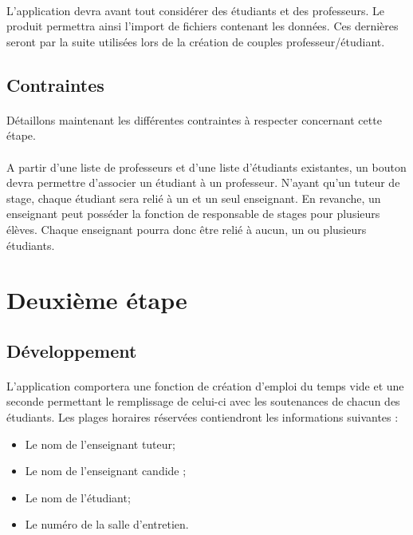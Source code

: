 \documentclass[a4paper,10pt]{report}
\begin{document}
	\paragraph{}
	L'application devra avant tout considérer des étudiants et des professeurs.
	\newline
	Le produit permettra ainsi l'import de fichiers contenant les données. 
	Ces dernières seront par la suite utilisées lors de la création de couples professeur/étudiant. 
  
      \subsection{Contraintes}
	\paragraph{}
	Détaillons maintenant les différentes contraintes à respecter concernant cette étape. 
	\paragraph{}
	A partir d'une liste de professeurs et d'une liste d'étudiants existantes, un bouton devra permettre d'associer un étudiant à un professeur.
	N'ayant qu'un tuteur de stage, chaque étudiant sera relié à un et un seul enseignant.
	En revanche, un enseignant peut posséder la fonction de responsable de stages pour plusieurs élèves. 
	Chaque enseignant pourra donc être relié à aucun, un ou plusieurs étudiants.	
	
      
	
    \section{Deuxième étape}

      \subsection{Développement}
	
	\paragraph{}
	L’application comportera une fonction de création d’emploi du temps vide et une seconde permettant le remplissage de celui-ci avec les soutenances de chacun des étudiants.
	Les plages horaires réservées contiendront les informations suivantes :
	\renewcommand\labelitemi{\textbullet}
	\begin{itemize}
	  \item Le nom de l’enseignant tuteur;
	  \item Le nom de l’enseignant candide ;
	  \item Le nom de l’étudiant;
	  \item Le numéro de la salle d’entretien.
	\end{itemize}
	
\end{document}
